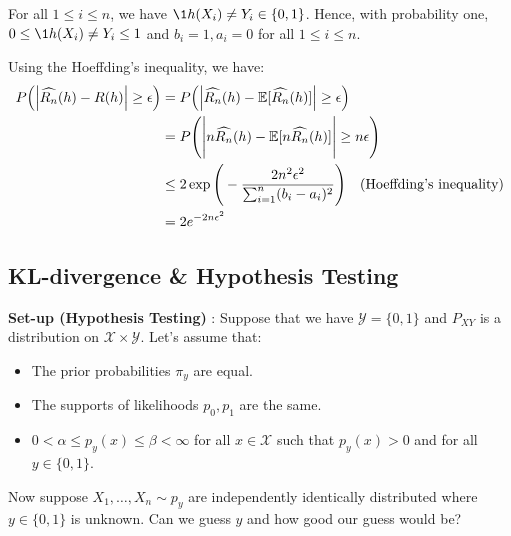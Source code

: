 \begin{proof*}
    For all $1 \le i \le n$, we have $\1{h(X_i) \ne Y_i} \in \{0,1\}$. Hence, with probability one, $0 \le \1{h(X_i)\ne Y_i} \le 1$ and $b_i=1, a_i=0$ for all $1\le i\le n$.

    \noindent \newline Using the Hoeffding's inequality, we have:
    \begin{align*}
        P\Big( 
            \Big| \widehat{R_n}(h) - R(h) \Big| \ge \epsilon
         \Big) 
        &= P\Big( 
            \Big| \widehat{R_n}(h) - \mathbb{E}[\widehat{R_n}(h)] \Big| \ge \epsilon
         \Big) \\
        &= P\Bigg( 
            \Bigg| n\widehat{R_n}(h) - \mathbb{E}[n\widehat{R_n}(h)] \Bigg| \ge n\epsilon
         \Bigg) \\
        &\le 2\exp\Bigg( 
            - \frac{2n^2\epsilon^2}{\sum_{i=1}^n (b_i - a_i)^2}
         \Bigg) \ \ \ \text{(Hoeffding's inequality)} \\
        &= 2e^{-2n\epsilon^2}
    \end{align*}
\end{proof*}


\subsection{KL-divergence \& Hypothesis Testing}
\textbf{Set-up (Hypothesis Testing)} : Suppose that we have $\mathcal{Y}=\{0,1\}$ and $P_{XY}$ is a distribution on $\mathcal{X}\times\mathcal{Y}$. Let's assume that:
\begin{itemize}
    \item The prior probabilities $\pi_y$ are equal.
    \item The supports of likelihoods $p_0,p_1$ are the same.
    \item $0 < \alpha \le p_y(x) \le \beta < \infty$ for all $x\in \mathcal{X}$ such that $p_y(x)>0$ and for all $y\in\{0,1\}$.
\end{itemize}

\noindent Now suppose $X_1, \dots, X_n \sim p_y$ are independently identically distributed where $y\in\{0,1\}$ is unknown. Can we guess $y$ and how good our guess would be?

